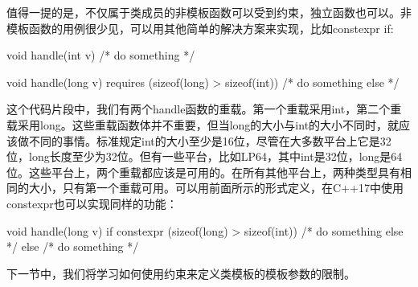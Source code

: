 值得一提的是，不仅属于类成员的非模板函数可以受到约束，独立函数也可以。非模板函数的用例很少见，可以用其他简单的解决方案来实现，比如constexpr if:

\begin{cpp}
void handle(int v)
{ /* do something */ }

void handle(long v)
	requires (sizeof(long) > sizeof(int))
{ /* do something else */ }
\end{cpp}

这个代码片段中，我们有两个handle函数的重载。第一个重载采用int，第二个重载采用long。这些重载函数体并不重要，但当long的大小与int的大小不同时，就应该做不同的事情。标准规定int的大小至少是16位，尽管在大多数平台上它是32位，long长度至少为32位。但有一些平台，比如LP64，其中int是32位，long是64位。这些平台上，两个重载都应该是可用的。在所有其他平台上，两种类型具有相同的大小，只有第一个重载可用。可以用前面所示的形式定义，在C++17中使用constexpr也可以实现同样的功能：

\begin{cpp}
void handle(long v)
{
	if constexpr (sizeof(long) > sizeof(int))
	{
		/* do something else */
	}
	else
	{
		/* do something */
	}
}
\end{cpp}

下一节中，我们将学习如何使用约束来定义类模板的模板参数的限制。


